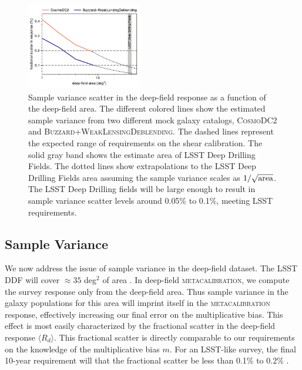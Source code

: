 \documentclass[twocolumn]{openjournal}
\makeatletter
\newcommand{\mcal}{\textsc{metacalibration}\@\xspace}
\newcommand{\descwl}{\textsc{WeakLensingDeblending}\@\xspace}
\newcommand{\cosmodctwo}{\textsc{CosmoDC2}\@\xspace}
\newcommand{\buzzard}{\textsc{Buzzard}\@\xspace}
\makeatother
\begin{document}
\begin{figure}
    \centering
    \includegraphics[width=0.45\textwidth]{sample_var.pdf}
    \caption{
      Sample variance scatter in the deep-field response as a function of the
      deep-field area. The different colored lines show the estimated sample variance
      from two different mock galaxy catalogs, \cosmodctwo and \buzzard+\descwl. The
      dashed lines represent the expected range of requirements on the shear
      calibration. The solid gray band shows the estimate area of LSST Deep Drilling
      Fields. The dotted lines show extrapolations to the LSST Deep Drilling Fields
      area assuming the sample variance scales as $1/\sqrt{\rm area}$. The LSST Deep
      Drilling fields will be large enough to result in sample variance scatter levels
      around 0.05\% to 0.1\%, meeting LSST requirements.
    }
    \label{fig:sample_variance}
\end{figure}


\subsection{Sample Variance}\label{sec:sv}

We now address the issue of sample variance in the deep-field dataset. The LSST DDF will
cover $\approx35$ deg$^2$ of area \citep{lsst-ddf-design,ivezic2019lsst}. In deep-field
\mcal, we compute the survey response only from the deep-field area. Thus sample
variance in the galaxy populations for this area will imprint itself in the \mcal
response, effectively increasing our final error on the multiplicative bias. This effect
is most easily characterized by the fractional scatter in the deep-field response
$\langle R_{d}\rangle$. This fractional scatter is directly comparable to our
requirements on the knowledge of the multiplicative bias $m$. For an LSST-like survey,
the final 10-year requirement will that the fractional scatter be less than 0.1\% to
0.2\% \citep{huterer2006,descsrd}.
\end{document}
